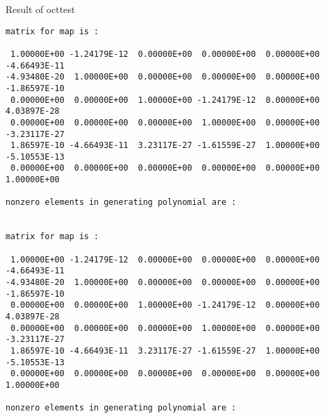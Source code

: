 Result of octtest
\begin{footnotesize}
\begin{verbatim}
matrix for map is :

 1.00000E+00 -1.24179E-12  0.00000E+00  0.00000E+00  0.00000E+00 -4.66493E-11
-4.93480E-20  1.00000E+00  0.00000E+00  0.00000E+00  0.00000E+00 -1.86597E-10
 0.00000E+00  0.00000E+00  1.00000E+00 -1.24179E-12  0.00000E+00  4.03897E-28
 0.00000E+00  0.00000E+00  0.00000E+00  1.00000E+00  0.00000E+00 -3.23117E-27
 1.86597E-10 -4.66493E-11  3.23117E-27 -1.61559E-27  1.00000E+00 -5.10553E-13
 0.00000E+00  0.00000E+00  0.00000E+00  0.00000E+00  0.00000E+00  1.00000E+00

nonzero elements in generating polynomial are :


matrix for map is :

 1.00000E+00 -1.24179E-12  0.00000E+00  0.00000E+00  0.00000E+00 -4.66493E-11
-4.93480E-20  1.00000E+00  0.00000E+00  0.00000E+00  0.00000E+00 -1.86597E-10
 0.00000E+00  0.00000E+00  1.00000E+00 -1.24179E-12  0.00000E+00  4.03897E-28
 0.00000E+00  0.00000E+00  0.00000E+00  1.00000E+00  0.00000E+00 -3.23117E-27
 1.86597E-10 -4.66493E-11  3.23117E-27 -1.61559E-27  1.00000E+00 -5.10553E-13
 0.00000E+00  0.00000E+00  0.00000E+00  0.00000E+00  0.00000E+00  1.00000E+00

nonzero elements in generating polynomial are :
\end{verbatim}
\end{footnotesize}

\newpage
